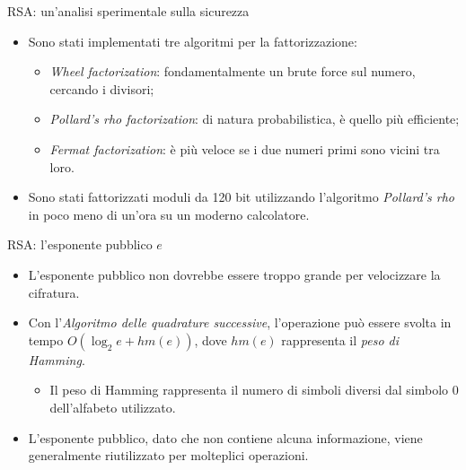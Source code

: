\documentclass[11pt,svgnames,smaller,aspectratio=169,italian]{beamer}
\begin{document}
\begin{frame}{RSA: un'analisi sperimentale sulla sicurezza}
	\begin{itemize}
		\item Sono stati implementati tre algoritmi per la fattorizzazione:
			\begin{itemize}
				\item \emph{Wheel factorization}: fondamentalmente un brute force sul numero, cercando i divisori;
				\item \emph{Pollard's rho factorization}: di natura probabilistica, è quello più efficiente;
				\item \emph{Fermat factorization}: è più veloce se i due numeri primi sono vicini tra loro.
			\end{itemize}
		\item Sono stati fattorizzati moduli da 120 bit utilizzando l'algoritmo \emph{Pollard's rho} in poco meno di un'ora su un moderno calcolatore.
	\end{itemize}
\end{frame}

\begin{frame}{RSA: l'esponente pubblico $e$}
	\begin{itemize}
		\item L'esponente pubblico non dovrebbe essere troppo grande per velocizzare la cifratura.
		\item Con l'\emph{Algoritmo delle quadrature successive}, l'operazione può essere svolta in tempo $O(\log_{2} e + hm(e))$, dove $hm(e)$ rappresenta il \emph{peso di Hamming}.
			\begin{itemize}
				\item Il peso di Hamming rappresenta il numero di simboli diversi dal simbolo $0$ dell'alfabeto utilizzato.
			\end{itemize}
		\item L'esponente pubblico, dato che non contiene alcuna informazione, viene generalmente riutilizzato per molteplici operazioni.
	\end{itemize}
\end{frame}
\end{document}
